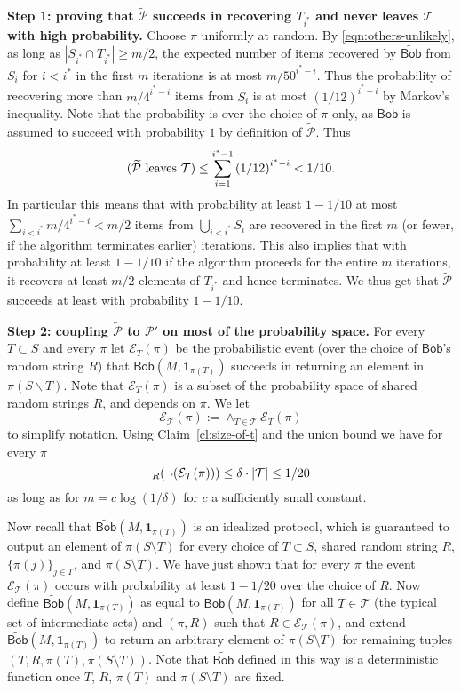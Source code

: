 \documentclass[11pt]{article}
\let\Pr\relax
\DeclareMathOperator*{\Pr}{\mathbb{P}}
\newcommand{\query}{\mathsf{Bob}}
\begin{document}
{\bf Step 1: proving that $\widetilde{\mathcal{P}}$ succeeds in recovering $T_{i^*}$ and never leaves $\mathcal{T}$ with high probability.}
Choose $\pi$ uniformly at random. By \eqref{eqn:others-unlikely}, as long as $|S_{i^*}\cap T_{i^*}|\geq m/2$, the expected number of items recovered by $\widetilde{\query}$ from $S_i$ for $i<i^*$ in the first $m$ iterations is at most $m/50^{i^*-i}$. Thus the probability of recovering more than $m/4^{i^*-i}$ items from $S_i$ is at most $(1/12)^{i^*-i}$ by Markov's inequality. Note that the probability is over the choice of $\pi$ only, as $\widetilde{\query}$ is assumed to succeed with probability $1$ by definition of $\widetilde{\mathcal{P}}$. 
Thus
$$
\Pr( \widetilde{\mathcal{P}}\text{~leaves~}\mathcal{T}) \le \sum_{i=1}^{i^*-1}\left(1/12\right)^{i^*-i} < 1/10.
$$
In particular this means that with probability at least $1-1/10$ at most $\sum_{i<i^*} m/4^{i^*-i}<m/2$ items from $\bigcup_{i<i^*} S_i$ are recovered in the first $m$ (or fewer, if the algorithm terminates earlier) iterations. This also implies that with probability at least $1-1/10$ if the algorithm proceeds for the entire $m$ iterations, it recovers at least $m/2$ elements of $T_{i^*}$ and hence terminates. We thus get that $\widetilde{\mathcal{P}}$ succeeds at least with probability $1-1/10$.

{\bf Step 2: coupling $\widetilde{\mathcal{P}}$ to $\mathcal{P}'$ on most of the probability space.}
For every $T\subset S$ and every $\pi$ let $\mathcal{E}_T(\pi)$ be the probabilistic event (over the choice of $\query$'s random string $R$) that $\query(M, \mathbf{1}_{\pi(T)})$ succeeds in returning an element in $\pi(S\backslash T)$. Note that $\mathcal{E}_T(\pi)$ is a subset of the probability space of shared random strings $R$, and depends on $\pi$. We let 
$$
\mathcal{E}_{\mathcal T}(\pi):=\wedge_{T\in\mathcal T} \mathcal E_T(\pi)
$$
to simplify notation. Using Claim~\ref{cl:size-of-t} and the union bound we have for every $\pi$
$$
\Pr_R(\neg(\mathcal E_{\mathcal T}(\pi))) \le \delta\cdot |\mathcal T|\leq 1/20
$$
as long as for $m = c\log(1/\delta)$ for $c$ a sufficiently small constant.

Now recall that $\widetilde{\query}(M, \mathbf{1}_{\pi(T)})$ is an idealized protocol, which is guaranteed to output an element of $\pi(S\setminus T)$ for every choice of  $T\subset S$, shared random string $R$, $\{\pi(j)\}_{j\in T}$, and $\pi(S\setminus T)$. We have just shown that for every $\pi$ the event ${\mathcal E_{\mathcal T}(\pi)}$ occurs  with probability at least $1-1/20$ over the choice of $R$. Now define $\widetilde{\query}(M, \mathbf{1}_{\pi(T)})$ as equal to $\query(M, \mathbf{1}_{\pi(T)})$ for all $T\in \mathcal{T}$ (the typical set of intermediate sets) and $(\pi, R)$ such that $R\in {\mathcal E_{\mathcal T}(\pi)}$, and extend $\widetilde{\query}(M, \mathbf{1}_{\pi(T)})$ to return an arbitrary element of $\pi(S\setminus T)$ for remaining tuples $(T, R, \pi(T),  \pi(S\setminus T))$. Note that $\widetilde{\query}$ defined in this way is a deterministic function once $T$, $R$, $\pi(T)$ and $\pi(S\setminus T)$ are fixed. 
\end{document}
